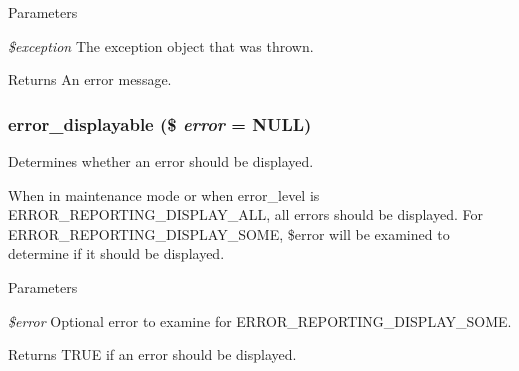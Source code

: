 \begin{DoxyParams}{Parameters}
\item[{\em \$exception}]The exception object that was thrown. \end{DoxyParams}
\begin{DoxyReturn}{Returns}
An error message. 
\end{DoxyReturn}
\hypertarget{errors_8inc_a84844a457938107e0ff1a1e5393feb8e}{
\subsubsection[{error\_\-displayable}]{\setlength{\rightskip}{0pt plus 5cm}error\_\-displayable (\$ {\em error} = {\ttfamily NULL})}}
\label{errors_8inc_a84844a457938107e0ff1a1e5393feb8e}
Determines whether an error should be displayed.

When in maintenance mode or when error\_\-level is ERROR\_\-REPORTING\_\-DISPLAY\_\-ALL, all errors should be displayed. For ERROR\_\-REPORTING\_\-DISPLAY\_\-SOME, \$error will be examined to determine if it should be displayed.


\begin{DoxyParams}{Parameters}
\item[{\em \$error}]Optional error to examine for ERROR\_\-REPORTING\_\-DISPLAY\_\-SOME.\end{DoxyParams}
\begin{DoxyReturn}{Returns}
TRUE if an error should be displayed. 
\end{DoxyReturn}
